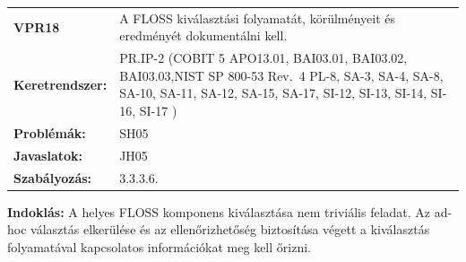 \documentclass[12pt,magyar,a4paper,oneside]{scrreprt}
\begin{document}
\begin{longtable}[]{@{}ll@{}}
\toprule
\endhead
\begin{minipage}[t]{0.16\columnwidth}\raggedright
\textbf{VPR18}\strut
\end{minipage} & \begin{minipage}[t]{0.79\columnwidth}\raggedright
A FLOSS kiválasztási folyamatát, körülményeit és eredményét dokumentálni
kell.\strut
\end{minipage}\tabularnewline
\begin{minipage}[t]{0.16\columnwidth}\raggedright
\textbf{Keretrendszer:}\strut
\end{minipage} & \begin{minipage}[t]{0.79\columnwidth}\raggedright
PR.IP-2 (COBIT 5 APO13.01, BAI03.01, BAI03.02, BAI03.03,NIST SP 800-53
Rev.~4 PL-8, SA-3, SA-4, SA-8, SA-10, SA-11, SA-12, SA-15, SA-17, SI-12,
SI-13, SI-14, SI-16, SI-17 )\strut
\end{minipage}\tabularnewline
\begin{minipage}[t]{0.16\columnwidth}\raggedright
\textbf{Problémák:}\strut
\end{minipage} & \begin{minipage}[t]{0.79\columnwidth}\raggedright
SH05\strut
\end{minipage}\tabularnewline
\begin{minipage}[t]{0.16\columnwidth}\raggedright
\textbf{Javaslatok:}\strut
\end{minipage} & \begin{minipage}[t]{0.79\columnwidth}\raggedright
JH05\strut
\end{minipage}\tabularnewline
\begin{minipage}[t]{0.16\columnwidth}\raggedright
\textbf{Szabályozás:}\strut
\end{minipage} & \begin{minipage}[t]{0.79\columnwidth}\raggedright
3.3.3.6.\strut
\end{minipage}\tabularnewline
\bottomrule
\end{longtable}

\textbf{Indoklás: } A helyes FLOSS komponens kiválasztása nem triviális
feladat. Az ad-hoc választás elkerülése és az ellenőrizhetőség
biztosítása végett a kiválasztás folyamatával kapcsolatos információkat
meg kell őrizni.
\end{document}

